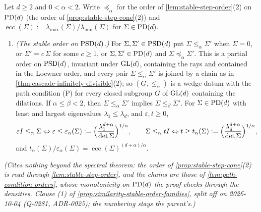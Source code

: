\begin{lemma}
\label{lem:stable-order-psd}
\leanok
Let $d \ge 2$ and $0 < \alpha < 2$. Write $\preceq_\alpha$ for the order of
\ref{lem:stable-step-order}(2) on $\mathrm{PD}(d)$ (the order of \ref{prop:stable-step-cone}(2)) and
$\operatorname{ecc}(\Sigma) :=
\lambda_{\max}(\Sigma)/\lambda_{\min}(\Sigma)$ for $\Sigma \in \mathrm{PD}(d)$.
\begin{enumerate}
\item[(1)] \emph{(The stable order on $\mathrm{PSD}(d)$.)} For $\Sigma, \Sigma' \in \mathrm{PSD}(d)$ put
$\Sigma \le_\alpha \Sigma'$ when $\Sigma = 0$, or $\Sigma' = c\,\Sigma$ for some $c \ge 1$, or
$\Sigma, \Sigma' \in \mathrm{PD}(d)$ and $\Sigma \preceq_\alpha \Sigma'$. This is a partial order on $\mathrm{PSD}(d)$,
invariant under $\mathrm{GL}(d)$, containing the rays and contained in the Loewner order, and every pair
$\Sigma \le_\alpha \Sigma'$ is joined by a chain as in \ref{thm:cascade-infinitely-divisible}(2); so
$(G, \le_\alpha)$ is a wedge datum with the path condition (P) for every closed subgroup $G$ of $\mathrm{GL}(d)$
containing the dilations. If $\alpha \le \beta < 2$, then $\Sigma \le_\alpha \Sigma'$ implies
$\Sigma \le_\beta \Sigma'$. For $\Sigma \in \mathrm{PD}(d)$ with least and largest eigenvalues
$\lambda_1 \le \lambda_d$, and $\varepsilon, t \ge 0$,
\[
  \varepsilon I \le_\alpha \Sigma \Leftrightarrow \varepsilon \le \varepsilon_\alpha(\Sigma) :=
  \Bigl(\frac{\lambda_1^{d+\alpha}}{\det\Sigma}\Bigr)^{1/\alpha} ,
  \qquad
  \Sigma \le_\alpha tI \Leftrightarrow t \ge t_\alpha(\Sigma) :=
  \Bigl(\frac{\lambda_d^{d+\alpha}}{\det\Sigma}\Bigr)^{1/\alpha} ,
\]
and $t_\alpha(\Sigma)/\varepsilon_\alpha(\Sigma) = \operatorname{ecc}(\Sigma)^{(d+\alpha)/\alpha}$.
\end{enumerate}
\statusT\quad\emph{(Cites nothing beyond the spectral theorem: the order of
\ref{prop:stable-step-cone}(2) is read through \ref{lem:stable-step-order}, and the chains are those of
\ref{lem:path-condition-orders}, whose monotonicity on $\mathrm{PD}(d)$ the proof checks through the densities.
Clause (1) of \ref{prop:similarity-stable-order-families}, split off on
2026-10-04 (Q-0281, ADR-0025); the numbering stays the parent's.)}
\end{lemma}

